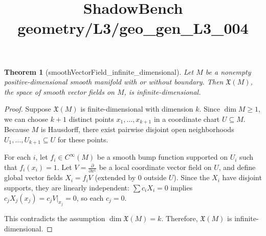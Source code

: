 \documentclass{article}
\title{ShadowBench geometry/L3/geo\_gen\_L3\_004}
\newtheorem{theorem}{Theorem}
\begin{document}
\maketitle

\begin{theorem}[smoothVectorField_infinite_dimensional]
Let $M$ be a nonempty positive-dimensional smooth manifold with or without boundary. Then $\mathfrak{X}(M)$, the space of smooth vector fields on $M$, is infinite-dimensional.
\end{theorem}

\begin{proof}
Suppose $\mathfrak{X}(M)$ is finite-dimensional with dimension $k$. 
Since $\dim M \ge 1$, we can choose $k+1$ distinct points $x_1, \dots, x_{k+1}$ in a coordinate chart $U \subseteq M$. 
Because $M$ is Hausdorff, there exist pairwise disjoint open neighborhoods $U_1, \dots, U_{k+1} \subseteq U$ for these points.

For each $i$, let $f_i \in C^\infty(M)$ be a smooth bump function supported on $U_i$ such that $f_i(x_i) = 1$. 
Let $V = \frac{\partial}{\partial x^1}$ be a local coordinate vector field on $U$, and define global vector fields $X_i = f_i V$ (extended by $0$ outside $U$). 
Since the $X_i$ have disjoint supports, they are linearly independent: $\sum c_i X_i = 0$ implies $c_j X_j(x_j) = c_j V|_{x_j} = 0$, so each $c_j = 0$.

This contradicts the assumption $\dim \mathfrak{X}(M) = k$. Therefore, $\mathfrak{X}(M)$ is infinite-dimensional.
\end{proof}
\end{document}
